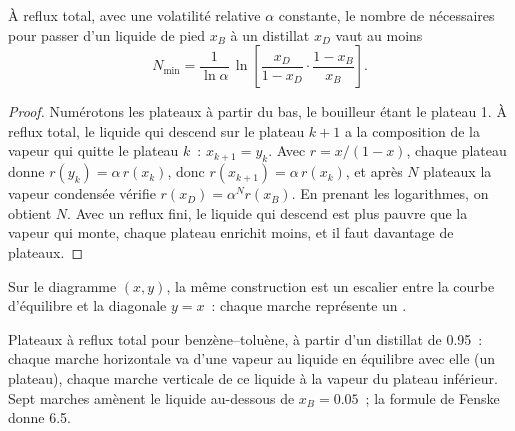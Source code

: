 \begin{proposition}[Fenske]\label{prop:b2:liquid-vapour-diagrams:fenske}
À reflux total, avec une volatilité relative $\alpha$ constante, le nombre de
 nécessaires pour passer d'un liquide de pied $x_B$ à un distillat
$x_D$ vaut au moins
\[
  N_{\min} = \frac{1}{\ln\alpha}\,\ln\!\left[\frac{x_D}{1 - x_D}\cdot\frac{1 - x_B}{x_B}\right] .
\]
\end{proposition}

\begin{proof}
Numérotons les plateaux à partir du bas, le bouilleur étant le plateau 1. À reflux total,
le liquide qui descend sur le plateau $k + 1$ a la composition de la vapeur
qui quitte le plateau $k$~: $x_{k+1} = y_k$. Avec $r = x/(1 - x)$, chaque plateau donne
$r(y_k) = \alpha\,r(x_k)$, donc $r(x_{k+1}) = \alpha\,r(x_k)$, et après $N$
plateaux la vapeur condensée vérifie $r(x_D) = \alpha^N r(x_B)$. En prenant les logarithmes,
on obtient $N$. Avec un reflux fini, le liquide qui descend est plus pauvre que la
vapeur qui monte, chaque plateau enrichit moins, et il faut davantage de plateaux.
\end{proof}

Sur le diagramme $(x, y)$, la même construction est un escalier entre la
courbe d'équilibre et la diagonale $y = x$~: chaque marche représente un .

\begin{omfigure}

{\small Plateaux à reflux total pour benzène--toluène, à partir d'un distillat de
0.95~: chaque marche horizontale va d'une vapeur au liquide en
équilibre avec elle (un plateau), chaque marche verticale de ce liquide à la
vapeur du plateau inférieur. Sept marches amènent le liquide au-dessous de $x_B = 0.05$~;
la formule de Fenske donne 6.5.}
\end{omfigure}

